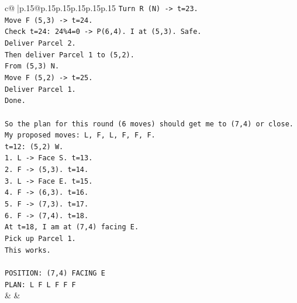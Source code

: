 \documentclass{article}
\begin{document}
{\begin{supertabular}{c@{$\;$}|p{.15\linewidth}@{}p{.15\linewidth}p{.15\linewidth}p{.15\linewidth}p{.15\linewidth}p{.15\linewidth}}
{{{\texttt{Turn R (N) {-}> t=23.} \\
\texttt{Move F (5,3) {-}> t=24.} \\
\texttt{Check t=24: 24\%4=0 {-}> P(6,4). I at (5,3). Safe.} \\
\texttt{Deliver Parcel 2.} \\
\texttt{Then deliver Parcel 1 to (5,2).} \\
\texttt{From (5,3) N.} \\
\texttt{Move F (5,2) {-}> t=25.} \\
\texttt{Deliver Parcel 1.} \\
\texttt{Done.} \\
\\ 
\texttt{So the plan for this round (6 moves) should get me to (7,4) or close.} \\
\texttt{My proposed moves: L, F, L, F, F, F.} \\
\texttt{t=12: (5,2) W.} \\
\texttt{1. L {-}> Face S. t=13.} \\
\texttt{2. F {-}> (5,3). t=14.} \\
\texttt{3. L {-}> Face E. t=15.} \\
\texttt{4. F {-}> (6,3). t=16.} \\
\texttt{5. F {-}> (7,3). t=17.} \\
\texttt{6. F {-}> (7,4). t=18.} \\
\texttt{At t=18, I am at (7,4) facing E.} \\
\texttt{Pick up Parcel 1.} \\
\texttt{This works.} \\
\\ 
\texttt{POSITION: (7,4) FACING E} \\
\texttt{PLAN: L F L F F F} \\
            }
        }
    }
    & & \\ \\


\end{supertabular}}
\end{document}
